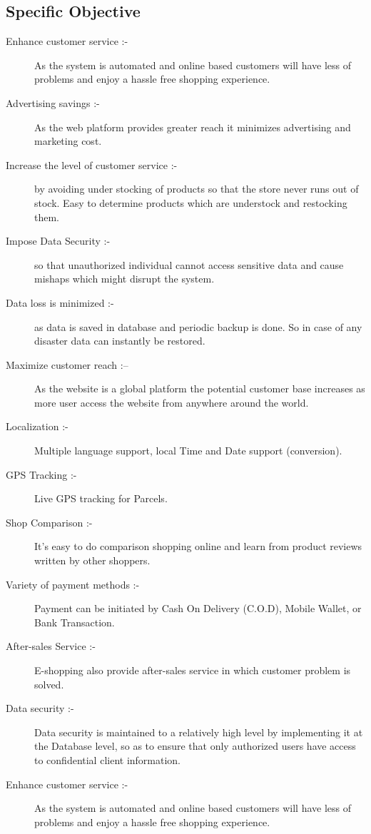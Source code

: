 \subsection{Specific Objective}
\begin{description}
	\item[Enhance customer service :-] As the system is automated and online based customers will have less of problems and enjoy a hassle free shopping experience.
	\item[Advertising savings :-] As the web platform provides greater reach it minimizes advertising and marketing cost.
	\item[Increase the level of customer service :-] by avoiding under stocking of products so that the store never runs out of stock. Easy to determine products which are understock and restocking them.
	\item[Impose Data Security :-] so that unauthorized individual cannot access sensitive data and
cause mishaps which might disrupt the system.
	\item[Data loss is minimized :-] as data is saved in database and periodic backup is done. So in case of any disaster data can instantly be restored.
	\item[Maximize customer reach :– ]As the website is a global platform the potential customer base increases as more user access the website from anywhere around the world.
	\item[Localization :-] Multiple language support, local Time and Date support (conversion).
	\item[GPS Tracking :-] Live GPS tracking for Parcels.
	\item[Shop Comparison :-] It's easy to do comparison shopping online and learn from product reviews written by other shoppers.
	\item[Variety of payment methods :-] Payment can be initiated by Cash On Delivery (C.O.D), Mobile Wallet, or Bank Transaction.
	\item[After-sales Service :-] E-shopping also provide after-sales service in which customer problem is solved.
	\item[Data security :-] Data security is maintained to a relatively high level by implementing it at the Database level, so as to ensure that only authorized users have access to confidential client information.
	\item[Enhance customer service :-] As the system is automated and online based customers will have less of problems and enjoy a hassle free shopping experience.

\end{description}
